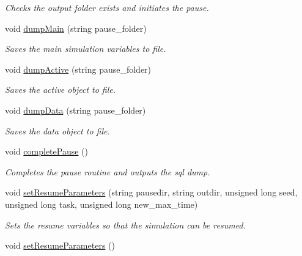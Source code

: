 \begin{DoxyCompactItemize}
\begin{DoxyCompactList}\small\item\em Checks the output folder exists and initiates the pause. \end{DoxyCompactList}\item 
void \hyperlink{class_tree_a4c2988184328a5236ca61f16744cfac2}{dump\+Main} (string pause\+\_\+folder)
\begin{DoxyCompactList}\small\item\em Saves the main simulation variables to file. \end{DoxyCompactList}\item 
void \hyperlink{class_tree_aca99503f49b91baae7401423fe547daf}{dump\+Active} (string pause\+\_\+folder)
\begin{DoxyCompactList}\small\item\em Saves the active object to file. \end{DoxyCompactList}\item 
void \hyperlink{class_tree_acd23fa139c7d097315c9479187b1a674}{dump\+Data} (string pause\+\_\+folder)
\begin{DoxyCompactList}\small\item\em Saves the data object to file. \end{DoxyCompactList}\item 
void \hyperlink{class_tree_a3fddb18a5d19b64dec378dca3d3fea31}{complete\+Pause} ()\hypertarget{class_tree_a3fddb18a5d19b64dec378dca3d3fea31}{}\label{class_tree_a3fddb18a5d19b64dec378dca3d3fea31}

\begin{DoxyCompactList}\small\item\em Completes the pause routine and outputs the sql dump. \end{DoxyCompactList}\item 
void \hyperlink{class_tree_ac545d844141db977920fc9fd76ce9dbb}{set\+Resume\+Parameters} (string pausedir, string outdir, unsigned long seed, unsigned long task, unsigned long new\+\_\+max\+\_\+time)
\begin{DoxyCompactList}\small\item\em Sets the resume variables so that the simulation can be resumed. \end{DoxyCompactList}\item 
void \hyperlink{class_tree_aeade4bccb8394937a53bc4fbcf2b4300}{set\+Resume\+Parameters} ()\hypertarget{class_tree_aeade4bccb8394937a53bc4fbcf2b4300}{}\label{class_tree_aeade4bccb8394937a53bc4fbcf2b4300}


\end{DoxyCompactItemize}

